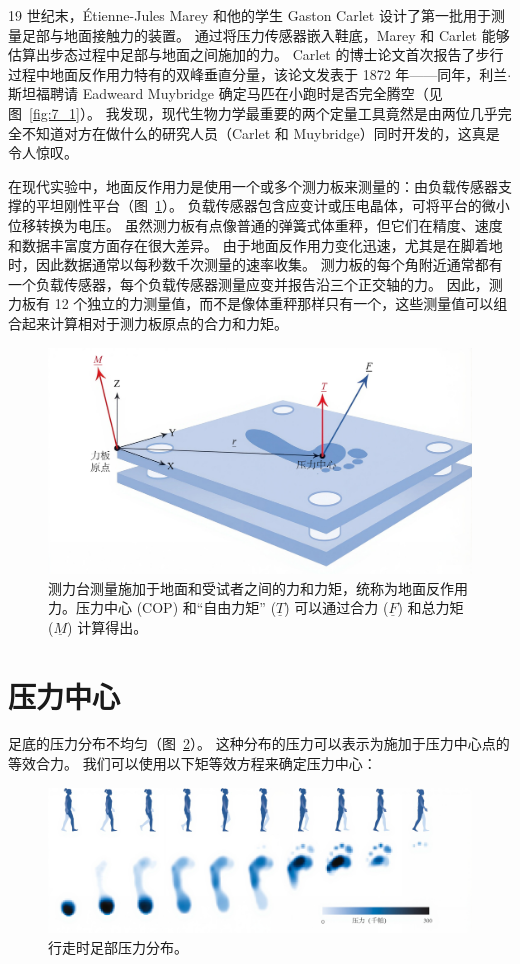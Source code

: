 19 世纪末，Étienne-Jules Marey 和他的学生 Gaston Carlet 设计了第一批用于测量足部与地面接触力的装置。
通过将压力传感器嵌入鞋底，Marey 和 Carlet 能够估算出步态过程中足部与地面之间施加的力。
Carlet 的博士论文首次报告了步行过程中地面反作用力特有的双峰垂直分量，该论文发表于 1872 年——同年，利兰$\cdot$斯坦福聘请 Eadweard Muybridge 确定马匹在小跑时是否完全腾空（见图~\ref{fig:7_1}）。
我发现，现代生物力学最重要的两个定量工具竟然是由两位几乎完全不知道对方在做什么的研究人员（Carlet 和 Muybridge）同时开发的，这真是令人惊叹。


在现代实验中，地面反作用力是使用一个或多个测力板来测量的：由负载传感器支撑的平坦刚性平台（图~\ref{fig:8_2}）。
负载传感器包含应变计或压电晶体，可将平台的微小位移转换为电压。
虽然测力板有点像普通的弹簧式体重秤，但它们在精度、速度和数据丰富度方面存在很大差异。
由于地面反作用力变化迅速，尤其是在脚着地时，因此数据通常以每秒数千次测量的速率收集。
测力板的每个角附近通常都有一个负载传感器，每个负载传感器测量应变并报告沿三个正交轴的力。
因此，测力板有 12 个独立的力测量值，而不是像体重秤那样只有一个，这些测量值可以组合起来计算相对于测力板原点的合力和力矩。


\begin{figure}[!htb]
	\centering
	\includegraphics[width=0.7\linewidth]{chap8/8_2}
	\caption{测力台测量施加于地面和受试者之间的力和力矩，统称为地面反作用力。压力中心 (COP) 和“自由力矩” ($\underline{T}$) 可以通过合力 ($\underline{F}$) 和总力矩 ($\underline{M}$) 计算得出。 \label{fig:8_2}}
\end{figure}



\section{压力中心}

足底的压力分布不均匀（图~\ref{fig:8_3}）。
这种分布的压力可以表示为施加于压力中心点的等效合力。
我们可以使用以下矩等效方程来确定压力中心：

\begin{figure}[!htb]
	\centering
	\includegraphics[width=1.0\linewidth]{chap8/8_3}
	\caption{行走时足部压力分布\cite{pataky2012gait}。 \label{fig:8_3}}
\end{figure}

